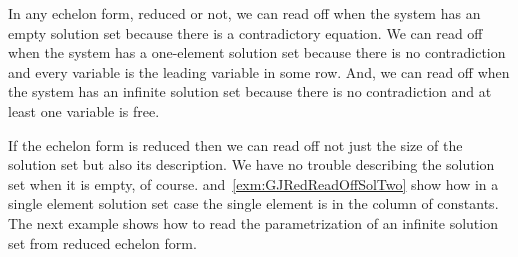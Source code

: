 In any echelon form, reduced or not, we can read off 
when the system has an empty
solution set because there is a contradictory equation.
We can read off 
when the system has a one-element solution set because there is no
contradiction and every
variable is the leading variable in some row.
And, we can read off when the system has an infinite solution set because 
there is no contradiction and at least one variable is free.

If the echelon form is reduced then we can read off not just the size of the  
solution set but also its description.
We have no trouble describing the solution set when it is empty, of course.
 and~\ref{exm:GJRedReadOffSolTwo} 
show how in a single element solution set case the single element is
in the column of constants.
The next example shows how to read the parametrization
of an infinite solution set from reduced echelon form.

